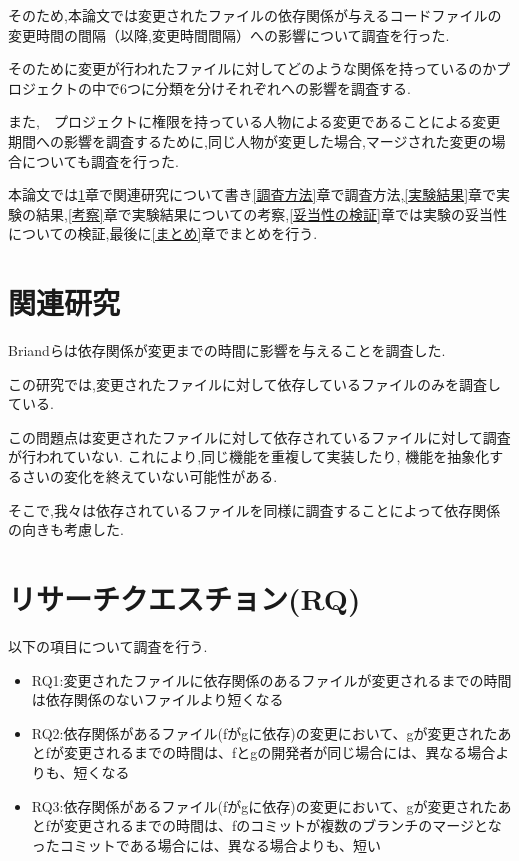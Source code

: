 \documentclass[submit,ses,noauthor]{ipsj} %
\begin{document}
そのため,本論文では変更されたファイルの依存関係が与えるコードファイルの変更時間の間隔（以降,変更時間間隔）への影響について調査を行った.

そのために変更が行われたファイルに対してどのような関係を持っているのかプロジェクトの中で6つに分類を分けそれぞれへの影響を調査する.

また,　プロジェクトに権限を持っている人物による変更であることによる変更期間への影響を調査するために,同じ人物が変更した場合,マージされた変更の場合についても調査を行った.


本論文では\ref{関連研究}章で関連研究について書き\ref{調査方法}章で調査方法,\ref{実験結果}章で実験の結果,\ref{考察}章で実験結果についての考察,\ref{妥当性の検証}章では実験の妥当性についての検証,最後に\ref{まとめ}章でまとめを行う.


\section{関連研究}\label{関連研究}

Briand\cite{Briand}らは依存関係が変更までの時間に影響を与えることを調査した.

この研究では,変更されたファイルに対して依存しているファイルのみを調査している.

この問題点は変更されたファイルに対して依存されているファイルに対して調査が行われていない.
これにより,同じ機能を重複して実装したり, 機能を抽象化するさいの変化を終えていない可能性がある.

そこで,我々は依存されているファイルを同様に調査することによって依存関係の向きも考慮した.


\section{リサーチクエスチョン(RQ)}\label{リサーチクエスチョン}
以下の項目について調査を行う.
\begin{itemize}
\item RQ1:変更されたファイルに依存関係のあるファイルが変更されるまでの時間は依存関係のないファイルより短くなる
\item RQ2:依存関係があるファイル(fがgに依存)の変更において、gが変更されたあとfが変更されるまでの時間は、fとgの開発者が同じ場合には、異なる場合よりも、短くなる
\item RQ3:依存関係があるファイル(fがgに依存)の変更において、gが変更されたあとfが変更されるまでの時間は、fのコミットが複数のブランチのマージとなったコミットである場合には、異なる場合よりも、短い
\end{itemize}
\end{document}
